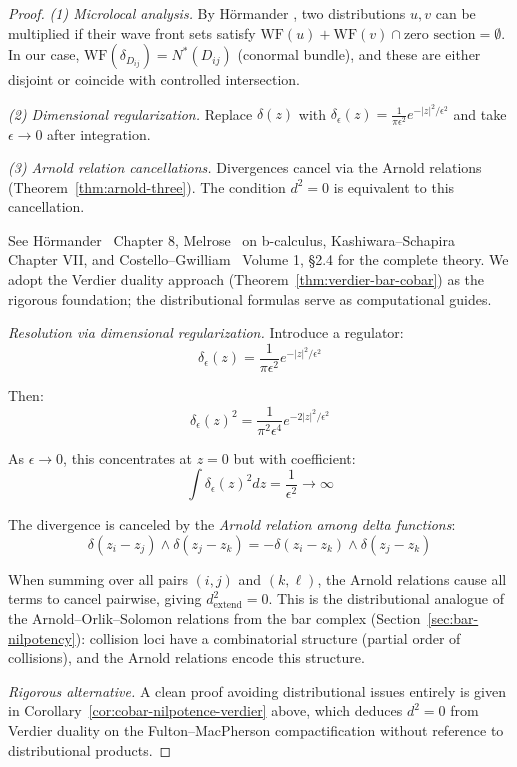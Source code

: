 \begin{proof}
{\emph{(1) Microlocal analysis.} By Hörmander \cite[Theorem 8.2.10]{Hormander}, two distributions 
$u, v$ can be multiplied if their wave front sets satisfy 
$\text{WF}(u) + \text{WF}(v) \cap \text{zero section} = \emptyset$. In our case, 
$\text{WF}(\delta_{D_{ij}}) = N^*(D_{ij})$ (conormal bundle), and these are either disjoint 
or coincide with controlled intersection.

\emph{(2) Dimensional regularization.} Replace $\delta(z)$ with 
$\delta_\epsilon(z) = \frac{1}{\pi\epsilon^2} e^{-|z|^2/\epsilon^2}$ and take $\epsilon \to 0$ 
after integration.

\emph{(3) Arnold relation cancellations.} Divergences cancel via the Arnold relations 
(Theorem~\ref{thm:arnold-three}). The condition $d^2 = 0$ is equivalent to this cancellation.

See Hörmander~\cite{Hormander} Chapter 8, Melrose~\cite{Mel93} on b-calculus, Kashiwara--Schapira~\cite{KS90} Chapter VII, and Costello--Gwilliam~\cite{CG17} Volume 1, \S2.4 for the complete theory.
We adopt the Verdier duality approach (Theorem~\ref{thm:verdier-bar-cobar}) as the rigorous foundation; the distributional formulas serve as computational guides.%
}%

\emph{Resolution via dimensional regularization.} Introduce a regulator:
\[\delta_\epsilon(z) = \frac{1}{\pi \epsilon^2} e^{-|z|^2/\epsilon^2}\]

Then:
\[\delta_\epsilon(z)^2 = \frac{1}{\pi^2 \epsilon^4} e^{-2|z|^2/\epsilon^2}\]

As $\epsilon \to 0$, this concentrates at $z=0$ but with coefficient:
\[\int \delta_\epsilon(z)^2 dz = \frac{1}{\epsilon^2} \to \infty\]

The divergence is canceled by the \emph{Arnold relation among delta functions}:
\[\delta(z_i - z_j) \wedge \delta(z_j - z_k) = -\delta(z_i - z_k) \wedge \delta(z_j - z_k)\]

When summing over all pairs $(i,j)$ and $(k,\ell)$, the Arnold
relations cause all terms to cancel pairwise, giving $d_{\text{extend}}^2 = 0$.
This is the distributional analogue of the
Arnold--Orlik--Solomon relations from the bar complex (Section~\ref{sec:bar-nilpotency}):
collision loci have a combinatorial structure (partial order of collisions), and
the Arnold relations encode this structure.

\emph{Rigorous alternative.}  A clean proof avoiding distributional issues entirely is given in Corollary~\ref{cor:cobar-nilpotence-verdier} above, which deduces $d^2 = 0$ from Verdier duality on the Fulton--MacPherson compactification without reference to distributional products.


\end{proof}
